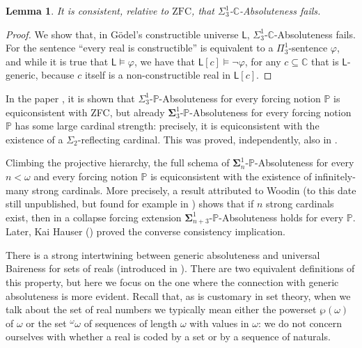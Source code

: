 \documentclass[10pt]{amsart}
\newtheorem{lemma}[theorem]{Lemma}
\theoremstyle{definition}
\begin{document}
\begin{lemma}
    It is consistent, relative to $\mathrm{ZFC}$, that $\Sigma^1_3$-$\mathbb C$-Absoluteness fails.
\end{lemma}

\begin{proof}
    We show that, in Gödel's constructible universe $\mathsf L$, $\Sigma^1_3$-$\mathbb C$-Absoluteness fails. For the sentence ``every real is constructible'' is equivalent to a $\Pi^1_3$-sentence $\varphi$, and while it is true that $\mathsf L\models \varphi$, we have that $\mathsf L[c]\models \lnot\varphi$, for any $c\subseteq \mathbb C$ that is $\mathsf L$-generic, because $c$ itself is a non-constructible real in $\mathsf L[c]$.
\end{proof}

In the paper \cite{BagFri}, it is shown that $\Sigma^1_3$-$\mathbb P$-Absoluteness for every forcing notion $\mathbb P$ is equiconsistent with ZFC, but already $\boldsymbol\Sigma^1_3$-$\mathbb P$-Absoluteness for every forcing notion $\mathbb P$ has some large cardinal strength: precisely, it is equiconsistent with the existence of a $\Sigma_2$-reflecting cardinal. This was proved, independently, also in \cite{FMW}.\medskip

Climbing the projective hierarchy, the full schema of $\boldsymbol\Sigma^1_n$-$\mathbb P$-Absoluteness for every $n<\omega$ and every forcing notion $\mathbb P$ is equiconsistent with the existence of infinitely-many strong cardinals. More precisely, a result attributed to Woodin (to this date still unpublished, but found for example in \cite{Wilson}) shows that if $n$ strong cardinals exist, then in a collapse forcing extension $\boldsymbol\Sigma^1_{n+3}$-$\mathbb P$-Absoluteness holds for every $\mathbb P$. Later, Kai Hauser (\cite{Kai}) proved the converse consistency implication.\medskip

There is a strong intertwining between generic absoluteness and universal Baireness for sets of reals (introduced in \cite{FMW}). There are two equivalent definitions of this property, but here we focus on the one where the connection with generic absoluteness is more evident. Recall that, as is customary in set theory, when we talk about the set of real numbers we typically mean either the powerset $\wp(\omega)$ of $\omega$ or the set ${}^\omega\omega$ of sequences of length $\omega$ with values in $\omega$: we do not concern ourselves with whether a real is coded by a set or by a sequence of naturals.
\end{document}
